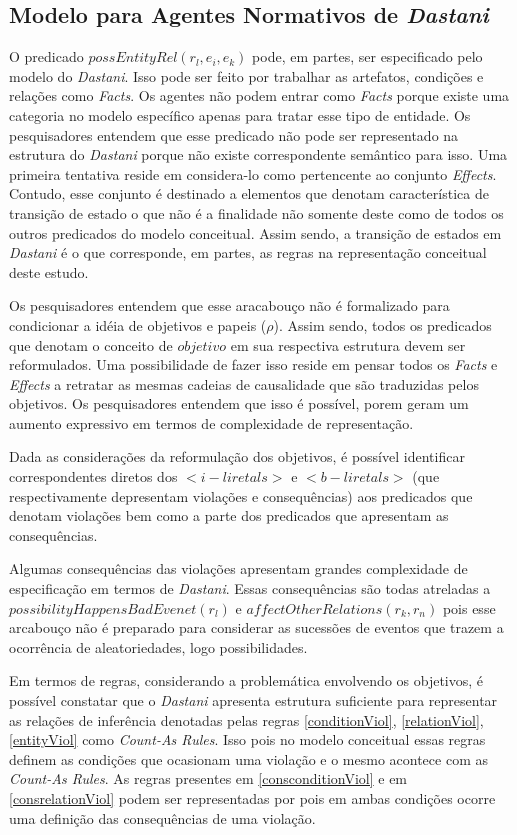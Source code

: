 \subsection{Modelo para Agentes Normativos de \textit{Dastani}}

O predicado $possEntityRel(r_l,e_i,e_k)$ pode, em partes, ser especificado pelo modelo do \textit{Dastani}. Isso pode ser feito por trabalhar as artefatos, condições e relações como \textit{Facts}. Os agentes não podem entrar como \textit{Facts} porque existe uma categoria no modelo específico apenas para tratar esse tipo de entidade. Os pesquisadores entendem que esse predicado não pode ser representado na estrutura do \textit{Dastani} porque não existe correspondente semântico para isso. Uma primeira tentativa reside em considera-lo como pertencente ao conjunto \textit{Effects}. Contudo, esse conjunto é destinado a elementos que denotam característica 
de transição de estado o que não é a finalidade não somente deste como de todos os outros predicados do modelo conceitual. Assim sendo, a transição de estados em  \textit{Dastani} é o que corresponde, em partes, as regras na representação conceitual deste estudo. 

Os pesquisadores entendem que esse aracabouço não é formalizado para condicionar a idéia de objetivos e papeis ($\rho$). Assim sendo, todos os predicados que denotam o conceito de $objetivo$ em sua respectiva estrutura devem ser reformulados. Uma possibilidade de fazer isso reside em pensar todos os \textit{Facts} e \textit{Effects} a retratar as mesmas cadeias de causalidade que são traduzidas pelos objetivos. Os pesquisadores entendem que isso é possível, porem geram um aumento expressivo em termos de complexidade de representação. 

Dada as considerações da reformulação dos objetivos, é possível identificar correspondentes diretos dos $<i-liretals>$  e $<b-liretals>$ (que respectivamente depresentam violações e consequências) aos predicados que denotam violações bem como a parte dos predicados que apresentam as consequências. 

Algumas consequências das violações apresentam grandes complexidade de especificação em termos de \textit{Dastani}. Essas consequências são todas atreladas a $possibilityHappensBadEvenet(r_l)$ e $affectOtherRelations(r_k,r_n)$ pois esse arcabouço não é preparado para considerar as sucessões de eventos que trazem a ocorrência de aleatoriedades, logo possibilidades. 

Em termos de regras, considerando a problemática envolvendo os objetivos, é possível constatar que o \textit{Dastani} apresenta estrutura suficiente para representar as relações de inferência denotadas pelas regras \ref{conditionViol}, \ref{relationViol}, \ref{entityViol} como \textit{Count-As Rules}. Isso pois no modelo conceitual essas regras definem as condições que ocasionam uma violação e o mesmo acontece com as \textit{Count-As Rules}. As regras presentes em \ref{consconditionViol} e em \ref{consrelationViol} podem ser representadas por  pois em ambas condições ocorre uma definição das consequências de uma violação. 